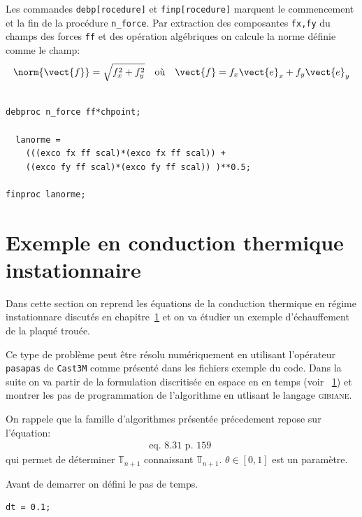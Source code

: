 \begin{castemcom}
Les commandes \texttt{debp[rocedure]} et \texttt{finp[rocedure]}  marquent 
le commencement et la fin de la procédure \texttt{n\_force}. Par extraction 
des composantes \texttt{fx,fy} du champs des forces \texttt{ff} et des 
opération algébriques on calcule la norme définie comme le champ:
$$
 \norm{\vect{f}} = \sqrt{f_x^2 + f_y^2} \quad \text{où} \quad \vect{f} = f_x \vect{e}_x + f_y \vect{e}_y 
$$  
  
\end{castemcom}
\begin{castemlines}
\begin{verbatim}

debproc n_force ff*chpoint;
      
  lanorme = 
    (((exco fx ff scal)*(exco fx ff scal)) +  
    ((exco fy ff scal)*(exco fy ff scal)) )**0.5;

finproc lanorme; 

\end{verbatim}
\end{castemlines}



\section{Exemple en conduction thermique instationnaire}

Dans cette section on reprend les équations de la conduction thermique 
en régime instationnare discutés en chapitre~\ref{} et on va étudier 
un exemple d'échauffement de la plaqué trouée.  

Ce type de problème peut être résolu numériquement en utilisant 
l'opérateur \texttt{pasapas} de \texttt{Cast3M} comme présenté 
dans les fichiers exemple du code. Dans la suite on va partir de 
la formulation discritisée en espace en en temps (voir ~\ref{}) 
et montrer les pas de programmation de l'algorithme en utlisant 
le langage \textsc{gibiane}. 

On rappele que la famille d'algorithmes présentée précedement
repose sur l'équation:
\begin{eqnarray}
  \text{eq. 8.31 p. 159 }
\end{eqnarray} 
qui permet de déterminer $\mathbb{T}_{n+1}$ connaissant $\mathbb{T}_{n+1}$.
$\theta \in [0,1]$ est un paramètre. 

\begin{castemcom}
Avant de demarrer on défini le pas de temps. 
\end{castemcom}
\begin{castemlines}
\begin{verbatim}
dt = 0.1;
\end{verbatim}
\end{castemlines}

